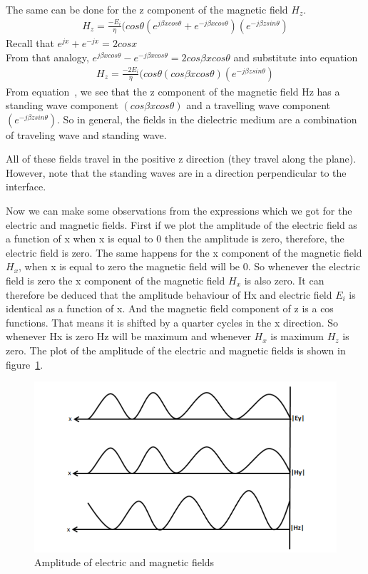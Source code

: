 The same can be done for the z component of the magnetic field $H_z$.
\begin{align}
H_z = \frac{-E_i}{\eta}(cos\theta(e^{j\beta xcos\theta} + e^{-j\beta xcos\theta}) (e^{-j\beta zsin\theta})
\label{eqn:totalmagfieldz}
\end{align}  
Recall that $e^{jx} + e^{-jx} = 2cosx$\\
From that analogy, $e^{j\beta xcos \theta} - e^{-j\beta xcos\theta} = 2cos\beta xcos\theta$ and substitute into equation~
\begin{align}
H_z = \frac{-2E_i}{\eta}(cos\theta(cos\beta xcos\theta) (e^{-j \beta zsin\theta})
\label{eqn:totalmagfieldz2}
\end{align}
From equation~, we see that the z component of the magnetic field Hz has a standing wave component $(cos\beta xcos\theta)$ and a travelling wave component $(e^{-j\beta zsin\theta})$. So in general, the fields in the dielectric medium are a combination of traveling wave and standing wave.

All of these fields travel in the positive z direction (they travel along the plane). However, note that the standing waves are in a direction perpendicular to the interface.
 
Now we can make some observations from the expressions which we got for the electric and magnetic fields. First if we plot the amplitude of the electric field as a function of x when x is equal to 0 then the amplitude is zero, therefore, the electric field is zero. The same happens for the x component of the magnetic field $H_x$, when x is equal to zero the magnetic field will be 0. So whenever the electric field is zero the x component of the magnetic field $H_x$ is also zero. It can therefore be deduced that the amplitude behaviour of Hx and electric field $E_i$ is identical as a function of x. And the magnetic field component of z is a cos functions. That means it is shifted by a quarter cycles in the x direction. So whenever Hx is zero Hz will be maximum and whenever $H_x$ is maximum $H_z$ is zero. The plot of the amplitude of the electric and magnetic fields is shown in figure~\ref{fig:amplitude}.
\begin{figure}[h]
\centering
\includegraphics[width=1\linewidth]{./graphics/amplitude.png}
\caption{Amplitude of electric and magnetic fields}
\label{fig:amplitude}
\end{figure}

